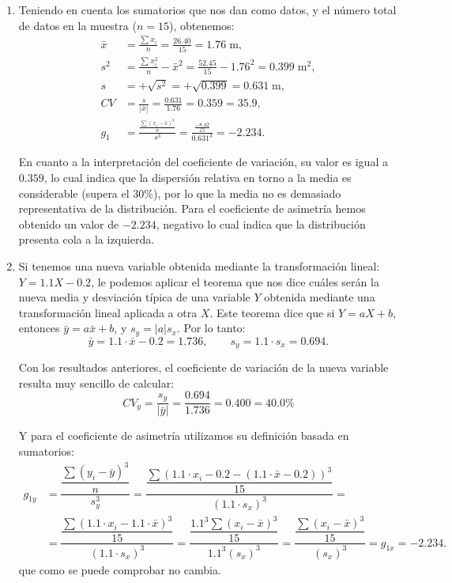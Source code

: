 {\begin{enumerate}
\item Teniendo en cuenta los sumatorios que nos dan como datos, y el número total de datos en la muestra ($n=15$), obtenemos:
\begin{align*}
\bar x &= \frac{{\sum {x_i } }}{n} = \frac{{26.40}}{15} = 1.76\; \mbox{m},\\
s ^2  &= \frac{{\sum {x_i ^2 } }}{n} - \bar x^2  = \frac{{52.45}}{15} - 1.76^2  =0.399\;\mbox{m}^2,\\
s &=  + \sqrt {s^2 }  =  + \sqrt {0.399}  = 0.631\;\mbox{m},\\
CV &= \frac{s}{{\left| {\bar x} \right|}} = \frac{{0.631}}{{1.76}} = 0.359 = 35.9,\\
g_1 &= \frac{{\frac{{\sum {\left( {x_i  - \bar x} \right)^3 } }}{n}}}{{s^3 }} = \frac{{\frac{{ - 8.42}}{{15}}}}{{0.631^3 }} =  - 2.234.
\end{align*}

En cuanto a la interpretación del coeficiente de variación, su valor es igual a $0.359$, lo cual indica que la dispersión relativa en torno a la media es considerable (supera el 30\%), por lo que la media no es demasiado representativa de la distribución. Para el coeficiente de asimetría hemos obtenido un valor de $-2.234$, negativo lo cual indica que la distribución presenta cola a la izquierda.

\item Si tenemos una nueva variable obtenida mediante la transformación lineal: $Y=1.1 X -0.2$, le podemos aplicar el teorema que nos dice cuáles serán la nueva media y desviación típica de una variable $Y$ obtenida mediante una transformación lineal aplicada a otra $X$. Este teorema dice que si $Y=aX+b$, entonces $\bar y=a \bar x +b$, y $s_y = \left| a \right| s_x$. Por lo tanto:
\[
\bar y = 1.1 \cdot \bar x - 0.2 = 1.736,\qquad s_y  = 1.1 \cdot s_x  = 0.694.
\]

Con los resultados anteriores, el coeficiente de variación de la nueva variable resulta muy sencillo de calcular:
\[
CV_y = \frac{s_y}{{\left| {\bar y} \right|}} = \frac{{0.694}}{{1.736}} = 0.400 = 40.0\%
\]

Y para el coeficiente de asimetría utilizamos su definición basada en sumatorios:
\begin{align*}
g_{1y}  &= \dfrac{{\dfrac{{\sum {\left( {y_i  - \bar y} \right)^3 } }}{n}}}{{s_y ^3 }} = \dfrac{{\dfrac{{\sum {\left( {1.1 \cdot x_i  - 0.2 - \left( {1.1 \cdot \bar x - 0.2} \right)} \right)^3 } }}{{15}}}}{{\left( {1.1 \cdot s_x } \right)^3 }} =\\
&= \dfrac{{\dfrac{{\sum {\left( {1.1 \cdot x_i  - 1.1 \cdot \bar x} \right)^3 } }}{{15}}}}{{\left( {1.1 \cdot s_x } \right)^3 }} = \dfrac{{\dfrac{{1.1^3 \sum {\left( {x_i  - \bar x} \right)^3 } }}{{15}}}}{{1.1^3 \left( {s_x } \right)^3 }} = \dfrac{{\dfrac{{\sum {\left( {x_i  - \bar x} \right)^3 } }}{{15}}}}{{\left( {s_x } \right)^3 }} = g_{1x}  =  - 2.234.
\end{align*}
que como se puede comprobar no cambia.
\end{enumerate}
}


